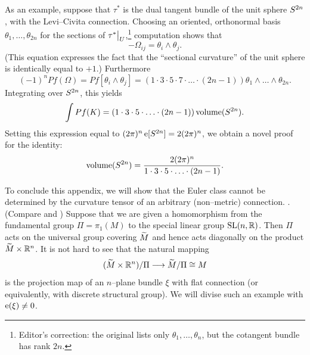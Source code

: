 \documentclass[../main]{subfiles}
\begin{document}
As an example, suppose that $\tau^\ast$ is the dual tangent bundle of the unit sphere $S^{2n}$, with the Levi--Civita connection. Choosing an oriented, orthonormal basis $\theta_1, \ldots, \theta_{2n}$ for the sections of $\tau^\ast \big{|}_U$,\footnote{Editor's correction: the original lists only $\theta_1,\ldots,\theta_n$, but the cotangent bundle has rank $2n$.} computation shows that \[-\Omega_{ij} = \theta_i \wedge \theta_j.\] (This equation expresses the fact that the ``sectional curvature'' of the unit sphere is identically equal to $+1$.) Furthermore \[(-1)^n Pf(\Omega) = Pf[\theta_i \wedge \theta_j] = (1 \cdot 3 \cdot 5 \cdot 7 \cdot \ldots \cdot (2n - 1)) \theta_1 \wedge \ldots \wedge \theta_{2n}.\] Integrating over $S^{2n}$, this yields \[\int Pf(K) = (1 \cdot 3 \cdot 5 \cdot \ldots \cdot (2n - 1)) \operatorname{volume}(S^{2n}).\] Setting this expression equal to $(2 \pi)^n \operatorname{e}[S^{2n}] = 2(2 \pi)^n$, we obtain a novel proof for the identity: \[\operatorname{volume}(S^{2n}) = \dfrac{2(2 \pi)^n}{1 \cdot 3 \cdot 5 \cdot \ldots \cdot (2n - 1)}.\] 

To conclude this appendix, we will show that the Euler class cannot be determined by the curvature tensor of an arbitrary (non--metric) connection. . (Compare \cite{Milnor1958} and \cite{wood}) Suppose that we are given a homomorphism from the fundamental group $\Pi = \pi_1(M)$ to the special linear group $\operatorname{SL}(n, \mathbb R)$. Then $\Pi$ acts on the universal group covering ${\xtilde M}$ and hence acts diagonally on the product ${\xtilde M} \times {\mathbb R}^n$. It is not hard to see that the natural mapping \[({\xtilde M} \times {\mathbb R}^n)/\Pi \longrightarrow {\xtilde M}/\Pi \cong M\] is the projection map of an $n$--plane bundle $\xi$ with flat connection (or equivalently, with discrete structural group). We will divise such an example with $\operatorname{e}(\xi) \ne 0$. 
\end{document}
